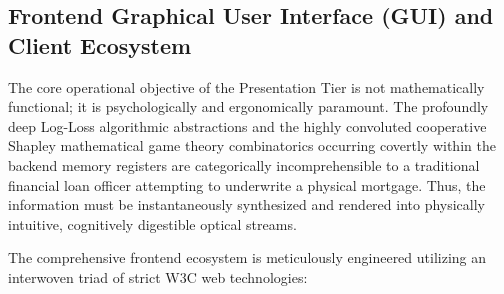\hypertarget{frontend-graphical-user-interface-gui-and-client-ecosystem}{%
\subsection{Frontend Graphical User Interface (GUI) and Client
Ecosystem}\label{frontend-graphical-user-interface-gui-and-client-ecosystem}}

The core operational objective of the Presentation Tier is not
mathematically functional; it is psychologically and ergonomically
paramount. The profoundly deep Log-Loss algorithmic abstractions and the
highly convoluted cooperative Shapley mathematical game theory
combinatorics occurring covertly within the backend memory registers are
categorically incomprehensible to a traditional financial loan officer
attempting to underwrite a physical mortgage. Thus, the information must
be instantaneously synthesized and rendered into physically intuitive,
cognitively digestible optical streams.

The comprehensive frontend ecosystem is meticulously engineered
utilizing an interwoven triad of strict W3C web technologies:

